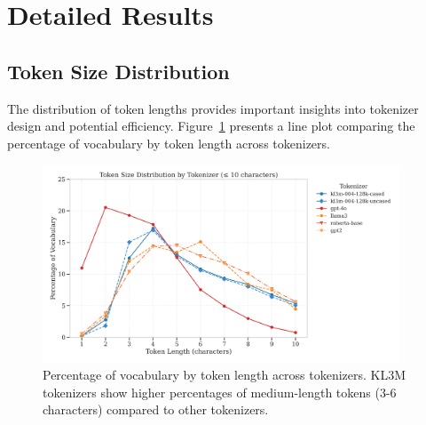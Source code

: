 \onecolumn

\appendix
\label{app:detailed_results}

\section{Detailed Results}
\label{app:detailed_tables}

\subsection{Token Size Distribution}
\label{app:token_size}

The distribution of token lengths provides important insights into tokenizer design and potential efficiency. Figure~\ref{fig:token_size_comparison} presents a line plot comparing the percentage of vocabulary by token length across tokenizers.

\begin{figure}[htbp]
    \centering
    \includegraphics[width=0.95\textwidth]{figures/token_size_comparison.png}
    \caption{Percentage of vocabulary by token length across tokenizers. KL3M tokenizers show higher percentages of medium-length tokens (3-6 characters) compared to other tokenizers.}
    \label{fig:token_size_comparison}
\end{figure}

